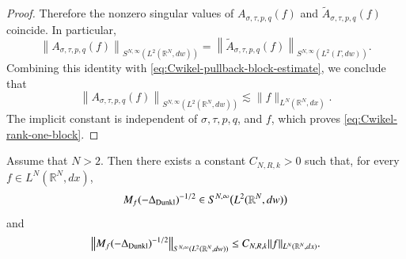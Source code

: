 \documentclass[12pt]{amsart}
\begin{document}
\begin{proof}
Therefore the nonzero singular values of
$A_{\sigma,\tau,p,q}(f)$ and
$\widetilde A_{\sigma,\tau,p,q}(f)$ coincide. In particular,
\[
\left\|
A_{\sigma,\tau,p,q}(f)
\right\|_{S^{N,\infty}(L^2(\mathbb R^N,dw))}
=
\left\|
\widetilde A_{\sigma,\tau,p,q}(f)
\right\|_{S^{N,\infty}(L^2(\Gamma,dw))}.
\]
Combining this identity with
\eqref{eq:Cwikel-pullback-block-estimate}, we conclude that
\[
\left\|
A_{\sigma,\tau,p,q}(f)
\right\|_
{S^{N,\infty}(L^2(\mathbb R^N,dw))}
\lesssim
\|f\|_{L^N(\mathbb R^N,dx)}.
\]
The implicit constant is independent of
$\sigma,\tau,p,q$, and $f$, which proves
\eqref{eq:Cwikel-rank-one-block}.
\end{proof}

\begin{lemma}\label{lem:Cwikel-Dunkl}
Assume that
$
N>2$.
Then there exists a constant $C_{N,R,k}>0$ such that, for every
$f\in L^N(\mathbb R^N,dx)$,
\[
M_f(-\Delta_{{\rm Dunkl}})^{-1/2}
\in
S^{N,\infty}\bigl(L^2(\mathbb R^N,dw)\bigr)
\]
and
\begin{equation}\label{eq:Cwikel-Dunkl}
\bigl\|
M_f(-\Delta_{{\rm Dunkl}})^{-1/2}
\bigr\|_
{S^{N,\infty}(L^2(\mathbb R^N,dw))}
\leq
C_{N,R,k}
\|f\|_{L^N(\mathbb R^N,dx)}.
\end{equation}
\end{lemma}
\end{document}
